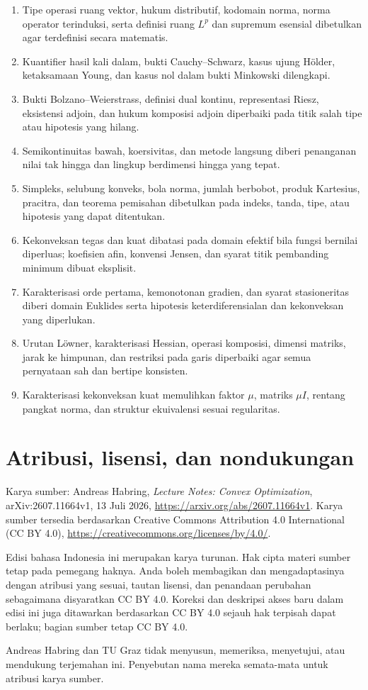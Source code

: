 \documentclass[indonesian]{shinybook}
\begin{document}
\begin{enumerate}
    \item Tipe operasi ruang vektor, hukum distributif, kodomain norma, norma
    operator terinduksi, serta definisi ruang $L^p$ dan supremum esensial
    dibetulkan agar terdefinisi secara matematis.
    \item Kuantifier hasil kali dalam, bukti Cauchy--Schwarz, kasus ujung
    H\"older, ketaksamaan Young, dan kasus nol dalam bukti Minkowski dilengkapi.
    \item Bukti Bolzano--Weierstrass, definisi dual kontinu, representasi Riesz,
    eksistensi adjoin, dan hukum komposisi adjoin diperbaiki pada titik salah
    tipe atau hipotesis yang hilang.
    \item Semikontinuitas bawah, koersivitas, dan metode langsung diberi
    penanganan nilai tak hingga dan lingkup berdimensi hingga yang tepat.
    \item Simpleks, selubung konveks, bola norma, jumlah berbobot, produk
    Kartesius, pracitra, dan teorema pemisahan dibetulkan pada indeks, tanda,
    tipe, atau hipotesis yang dapat ditentukan.
    \item Kekonveksan tegas dan kuat dibatasi pada domain efektif bila fungsi
    bernilai diperluas; koefisien afin, konvensi Jensen, dan syarat titik
    pembanding minimum dibuat eksplisit.
    \item Karakterisasi orde pertama, kemonotonan gradien, dan syarat
    stasioneritas diberi domain Euklides serta hipotesis keterdiferensialan dan
    kekonveksan yang diperlukan.
    \item Urutan L\"owner, karakterisasi Hessian, operasi komposisi, dimensi
    matriks, jarak ke himpunan, dan restriksi pada garis diperbaiki agar semua
    pernyataan sah dan bertipe konsisten.
    \item Karakterisasi kekonveksan kuat memulihkan faktor $\mu$, matriks
    $\mu I$, rentang pangkat norma, dan struktur ekuivalensi sesuai regularitas.
\end{enumerate}

\chapter*{Atribusi, lisensi, dan nondukungan}
Karya sumber: Andreas Habring, \emph{Lecture Notes: Convex Optimization},
arXiv:2607.11664v1, 13 Juli 2026,
\url{https://arxiv.org/abs/2607.11664v1}. Karya sumber tersedia berdasarkan
Creative Commons Attribution 4.0 International (CC BY 4.0),
\url{https://creativecommons.org/licenses/by/4.0/}.

Edisi bahasa Indonesia ini merupakan karya turunan. Hak cipta materi sumber
tetap pada pemegang haknya. Anda boleh membagikan dan mengadaptasinya dengan
atribusi yang sesuai, tautan lisensi, dan penandaan perubahan sebagaimana
disyaratkan CC BY 4.0. Koreksi dan deskripsi akses baru dalam edisi ini juga
ditawarkan berdasarkan CC BY 4.0 sejauh hak terpisah dapat berlaku; bagian
sumber tetap CC BY 4.0.

Andreas Habring dan TU Graz tidak menyusun, memeriksa, menyetujui, atau
mendukung terjemahan ini. Penyebutan nama mereka semata-mata untuk atribusi
karya sumber.
\end{document}
